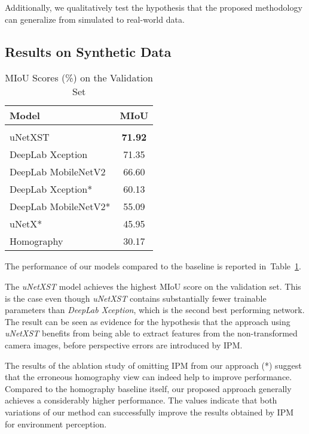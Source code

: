 \documentclass[a4paper, 10pt, conference]{ieeeconf}
\newcommand{\tab}[1]{Table~\ref{#1}}
\begin{document}
Additionally, we qualitatively test the hypothesis that the proposed methodology can generalize from simulated to real-world data.

\subsection{Results on Synthetic Data}

\setcounter{table}{0}
\begin{table}[t]
  \caption{MIoU Scores (\%) on the Validation Set}
  \begin{center}
    \begin{tabular}{l c}
      \textbf{Model} & \textbf{MIoU}\\
      \hline
      \\[-1em]
      uNetXST & \textbf{\num{71.92}}\\
      DeepLab Xception & \num{71.35}\\
      DeepLab MobileNetV2 & \num{66.60}\\
      DeepLab Xception* & \num{60.13}\\
      DeepLab MobileNetV2* & \num{55.09}\\
      uNetX* & \num{45.95}\\
      Homography & \num{30.17}\\
    \end{tabular}
  \end{center}
  \label{tab:MIoU}
\end{table}

The performance of our models compared to the baseline is reported in~\tab{tab:MIoU}.

The \textit{uNetXST} model achieves the highest MIoU score on the validation set. This is the case even though \textit{uNetXST} contains substantially fewer trainable parameters than \textit{DeepLab Xception}, which is the second best performing network. The result can be seen as evidence for the hypothesis that the approach using \textit{uNetXST} benefits from being able to extract features from the non-transformed camera images, before perspective errors are introduced by IPM.

The results of the ablation study of omitting IPM from our approach (*) suggest that the erroneous homography view can indeed help to improve performance. Compared to the homography baseline itself, our proposed approach generally achieves a considerably higher performance. The values indicate that both variations of our method can successfully improve the results obtained by IPM for environment perception.
\end{document}
